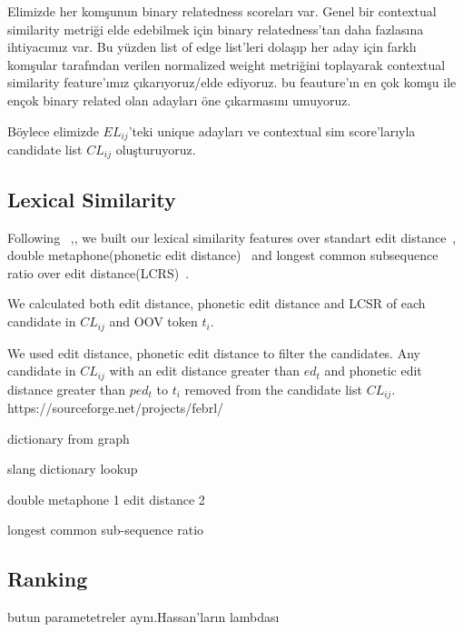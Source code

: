 Elimizde her komşunun binary relatedness scoreları var. Genel bir contextual similarity metriği elde edebilmek için binary relatedness'tan daha fazlasına ihtiyacımız var. Bu yüzden list of edge list'leri dolaşıp her aday için farklı komşular tarafından verilen normalized weight metriğini toplayarak contextual similarity feature'ımız çıkarıyoruz/elde ediyoruz. bu feauture'ın en çok komşu ile ençok binary related olan adayları öne çıkarmasını umuyoruz.

Böylece elimizde $EL_{ij}$'teki unique adayları ve contextual sim score'larıyla candidate list $CL_{ij}$ oluşturuyoruz.

\subsection{Lexical Similarity}

Following ~\cite{Han:2011:LNS:2002472.2002520},\cite{DBLP:conf/acl/HassanM13}, we built our lexical similarity features over standart edit distance~\cite{levenshtein1966bcc}, double metaphone(phonetic edit distance)~\cite{Philips:2000:DMS:349124.349132} and longest common subsequence ratio over edit distance(LCRS)~\cite{Contractor:2010:UCN:1944566.1944588}.

We calculated both edit distance, phonetic edit distance and LCSR of each candidate in $CL_{ij}$ and OOV token $t_i$.

We used edit distance, phonetic edit distance to filter the candidates. Any candidate in $CL_{ij}$ with an edit distance greater than $ed_t$ and phonetic edit distance greater than $ped_t$ to $t_i$ removed from the candidate list $CL_{ij}$.
https://sourceforge.net/projects/febrl/

dictionary from graph

slang dictionary lookup

double metaphone 1
edit distance 2


longest common sub-sequence ratio



\subsection{Ranking}

butun parametetreler aynı.Hassan'ların lambdası
